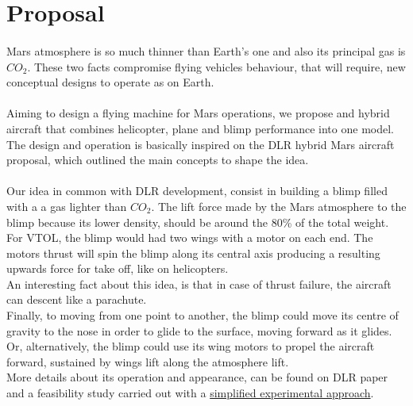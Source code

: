 \section{Proposal}
\paragraph{} Mars atmosphere is so much thinner than Earth's one and also its principal gas is $CO_2$. These two facts compromise flying vehicles behaviour, that will require, new conceptual designs to operate as on Earth.

\paragraph{} Aiming to design a flying machine for Mars operations, we propose and hybrid aircraft that combines helicopter, plane and blimp performance into one model. The design and operation is basically inspired on the DLR hybrid Mars aircraft proposal\cite{Singer2013}, which outlined the main concepts to shape the idea.

\paragraph{} Our idea in common with DLR development\cite{Singer2013}, consist in building a blimp filled with a a gas lighter than $CO_2$. The lift force made by the Mars atmosphere to the blimp because its lower density, should be around the 80\%  of the total weight. \\

\noindent For VTOL, the blimp would had two wings with a motor on each end. The motors thrust will spin the blimp along its central axis producing a resulting upwards force for take off, like on helicopters.\\

\noindent An interesting fact about this idea, is that in case of thrust failure, the aircraft can descent like a parachute.\\

\noindent Finally, to moving from one point to another, the blimp could move its centre of gravity to the nose in order to glide to the surface, moving forward as it glides. Or, alternatively, the blimp could use its wing motors to propel the aircraft forward, sustained by wings lift along the atmosphere lift.\\

\noindent More details about its operation and appearance, can be found on DLR paper\cite{Singer2013} and  a feasibility study carried out with a \href{http://airshipworld.blogspot.com.es/2007/07/hybrid-airplane-new-hybrid-airship.html}{simplified experimental approach}.

